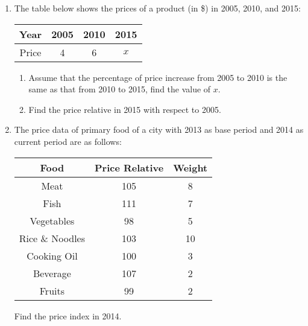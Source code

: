 \documentclass{report}
\begin{document}
\begin{multicols}{2}
\begin{enumerate}
    \item The table below shows the prices of a product (in \$) in 2005, 2010, and 2015:
          \begin{center}
            \begin{tabular}{|c|c|c|c|}
              \hline
              Year  & 2005 & 2010 & 2015 \\
              \hline
              Price & 4    & 6    & $x$  \\
              \hline
            \end{tabular}
          \end{center}
          \begin{enumerate}
            \item Assume that the percentage of price increase from 2005 to 2010 is the same as
                  that from 2010 to 2015, find the value of $x$.
            \item Find the price relative in 2015 with respect to 2005.
          \end{enumerate}

    \item The price data of primary food of a city with 2013 as base period and 2014 as
          current period are as follows:
          \begin{center}
            \begin{tabular}{|c|c|c|}
              \hline
              Food                   & Price Relative & Weight \\
              \hline
              Meat                   & 105            & 8      \\
              Fish                   & 111            & 7      \\
              Vegetables             & 98             & 5      \\
              Rice        \& Noodles & 103            & 10     \\
              Cooking Oil            & 100            & 3      \\
              Beverage               & 107            & 2      \\
              Fruits                 & 99             & 2      \\
              \hline
            \end{tabular}
          \end{center}
          Find the price index in 2014.


\end{enumerate}
\end{multicols}
\end{document}
